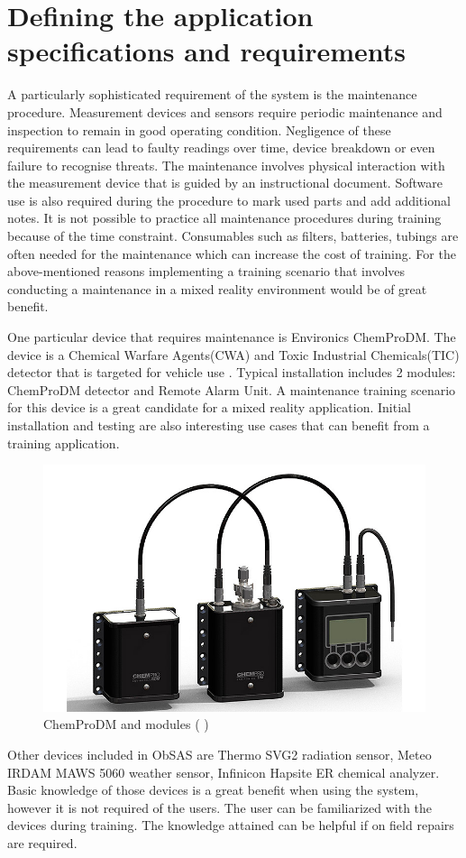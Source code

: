 \documentclass[12pt, a4paper,oneside, nocenter]{thesis}
\renewcommand{\citeyearpar}[1]{(\citeauthor{#1} \citeyear{#1})}
\begin{document}
\section{Defining the application specifications and requirements}
A particularly sophisticated requirement of the system is the maintenance procedure. Measurement devices and sensors require periodic maintenance and inspection to remain in good operating condition. Negligence of these requirements can lead to faulty readings over time, device breakdown or even failure to recognise threats. The maintenance involves physical interaction with the measurement device that is guided by an instructional document. Software use is also required during the procedure to mark used parts and add additional notes. It is not possible to practice all maintenance procedures during training because of the time constraint. Consumables such as filters, batteries, tubings are often needed for the maintenance which can increase the cost of training. For the above-mentioned reasons implementing a training scenario that involves conducting a maintenance in a mixed reality environment would be of great benefit.
\par
One particular device that requires maintenance is Environics ChemProDM. The device is a Chemical Warfare Agents(CWA) and Toxic Industrial Chemicals(TIC) detector that is targeted for vehicle use . Typical installation includes 2 modules: ChemProDM detector and Remote Alarm Unit. A maintenance training scenario for this device is a great candidate for a mixed reality application. Initial installation and testing are also interesting use cases that can benefit from a training application.
\begin{figure}[H]
	\includegraphics[width=\textwidth]{chemprodm}
	\caption{ChemProDM and modules \citeyearpar{environics-chemprodm}}
	\label{fig:chemprodm}
\end{figure}
\par
Other devices included in ObSAS are Thermo SVG2 radiation sensor, Meteo IRDAM MAWS 5060 weather sensor, Infinicon Hapsite ER chemical analyzer. Basic knowledge of those devices is a great benefit when using the system, however it is not required of the users. The user can be familiarized with the devices during training. The knowledge attained can be helpful if on field repairs are required.
\par
\end{document}
